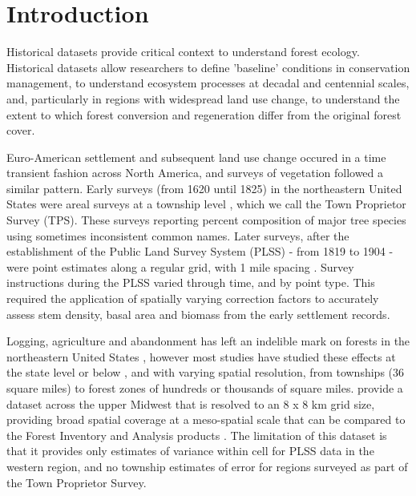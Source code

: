 \documentclass[12pt]{article}\usepackage[]{graphicx}\usepackage[]{color}
\begin{document}
\section{Introduction}

Historical datasets provide critical context to understand forest
ecology. Historical datasets allow researchers to define 'baseline'
conditions in conservation management, to understand ecosystem processes
at decadal and centennial scales, and, particularly in regions with
widespread land use change, to understand the extent to which forest
conversion and regeneration differ from the original forest cover.

Euro-American settlement and subsequent land use change occured in
a time transient fashion across North America, and surveys of vegetation
followed a similar pattern. Early surveys (from 1620 until 1825) in
the northeastern United States were areal surveys at a township level
\citep{cogbill2002forests,thompson2013four}, which we call the Town
Proprietor Survey (TPS). These surveys reporting percent composition
of major tree species using sometimes inconsistent common names. Later
surveys, after the establishment of the Public Land Survey System
(PLSS) - from 1819 to 1904 - were point estimates along a regular
grid, with 1 mile spacing \citep{schulte2001original,bourdo1956review,goring2015composition}.
Survey instructions during the PLSS varied through time, and by point
type. This required the application of spatially varying correction
factors \citep{cogbill2015corrections,goring2015composition} to accurately
assess stem density, basal area and biomass from the early settlement
records.

Logging, agriculture and abandonment has left an indelible mark on
forests in the northeastern United States \citep{foster1998land,goring2015composition,rhemtulla2009legacies,thompson2013four},
however most studies have studied these effects at the state level
or below \citep{rhemtulla2009historical,friedman2005regional}, and
with varying spatial resolution, from townships (36 square miles)
to forest zones of hundreds or thousands of square miles. \citet{goring2015composition}
provide a dataset across the upper Midwest that is resolved to an
8 x 8 km grid size, providing broad spatial coverage at a meso-spatial
scale that can be compared to the Forest Inventory and Analysis products
\citet{gray2012forest}. The limitation of this dataset is that it
provides only estimates of variance within cell for PLSS data in the
western region, and no township estimates of error for regions surveyed
as part of the Town Proprietor Survey.
\end{document}
